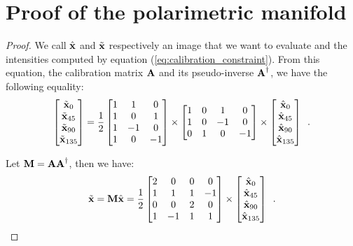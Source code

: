 \chapter{Proof of the polarimetric manifold}
\label{app:physical_prop}

\begin{proof}
	We call $\hat{\textbf{x}}$ and $\tilde{\textbf{x}}$ respectively an image that we want to evaluate and the intensities computed by equation (\ref{eq:calibration_constraint}). From this equation, the calibration matrix $\ma$ and its pseudo-inverse $\ma^\dagger$, we have the following equality:
	\begin{equation}
			\label{eq:app_problem}
		\begin{bmatrix} 
			\tilde{\textbf{x}}_0 \\
			\tilde{\textbf{x}}_{45} \\	
			\tilde{\textbf{x}}_{90} \\
			\tilde{\textbf{x}}_{135} 
		\end{bmatrix} = \frac{1}{2}\begin{bmatrix}
			1 & 1 & 0 \\
			1 & 0 & 1 \\
			1 & -1 & 0 \\
			1 & 0 & -1
		\end{bmatrix}
		\times \begin{bmatrix}
			1 & 0 & 1 & 0 \\
			1 & 0 & -1 & 0 \\
			0 & 1 & 0 & -1
		\end{bmatrix} \times \begin{bmatrix} 
			\hat{\textbf{x}}_0 \\
			\hat{\textbf{x}}_{45} \\
			\hat{\textbf{x}}_{90} \\
			\hat{\textbf{x}}_{135}
		\end{bmatrix}\enspace.
	\end{equation}
	
	Let $\mm = \ma\ma^\dagger$, then we have:
	$$
	\tilde{\vx} = \mm\hat{\vx} = \frac{1}{2}\begin{bmatrix}
		2 & 0 & 0 & 0 \\
		1 & 1 & 1 & -1 \\
		0 & 0 & 2 & 0 \\
		1 & -1 & 1 & 1
	\end{bmatrix} \times \begin{bmatrix} 
		\hat{\vx}_0 \\
		\hat{\vx}_{45} \\
		\hat{\vx}_{90} \\
		\hat{\vx}_{135}
	\end{bmatrix} \enspace.
	$$
	

\end{proof}

